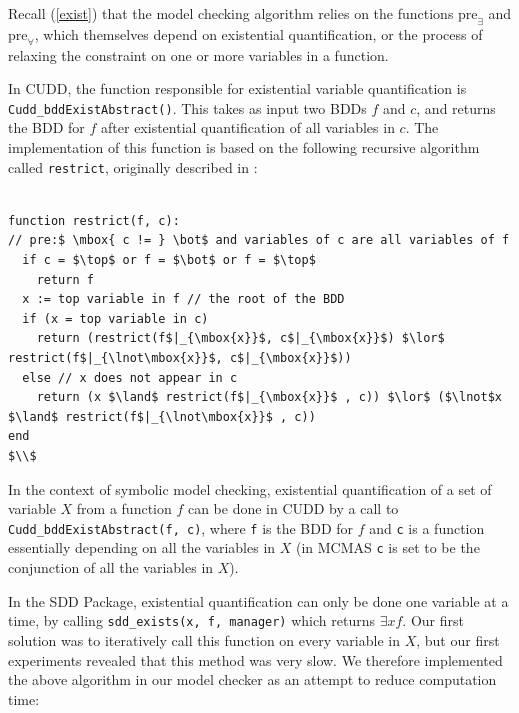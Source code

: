 \documentclass[11pt]{article}
\begin{document}
Recall  (\ref{exist}) that the model checking algorithm relies on the functions $\mbox{pre}_\exists$ and $\mbox{pre}_\forall$, which themselves depend on existential quantification, or the process of relaxing the constraint on one or more variables in a function. 

In CUDD, the function responsible for existential variable quantification is \texttt{Cudd\_bddExistAbstract()}. This takes as input two BDDs $f$ and $c$, and returns the BDD for $f$ after existential quantification of all variables in $c$. The implementation of this function is based on the following recursive algorithm called \texttt{restrict}, originally described in \cite{unified_framework}: 

\begin{lstlisting}[mathescape]

function restrict(f, c):
// pre:$ \mbox{ c != } \bot$ and variables of c are all variables of f
  if c = $\top$ or f = $\bot$ or f = $\top$
    return f
  x := top variable in f // the root of the BDD
  if (x = top variable in c)  
    return (restrict(f$|_{\mbox{x}}$, c$|_{\mbox{x}}$) $\lor$ restrict(f$|_{\lnot\mbox{x}}$, c$|_{\mbox{x}}$))
  else // x does not appear in c
    return (x $\land$ restrict(f$|_{\mbox{x}}$ , c)) $\lor$ ($\lnot$x $\land$ restrict(f$|_{\lnot\mbox{x}}$ , c))
end
$\\$
\end{lstlisting}

In the context of symbolic model checking, existential quantification of a set of variable $X$ from a function $f$ can be done in CUDD by a call to \texttt{Cudd\_bddExistAbstract(f, c)}, where \texttt{f} is the BDD for $f$ and \texttt{c} is a function essentially depending on all the variables in $X$ (in MCMAS \texttt{c} is set to be the conjunction of all the variables in $X$).

In the SDD Package, existential quantification can only be done one variable at a time, by calling \texttt{sdd\_exists(x, f, manager)} which returns $\exists x f$. Our first solution was to iteratively call this function on every variable in $X$, but our first experiments revealed that this method was very slow. We therefore implemented the above algorithm in our model checker as an attempt to reduce computation time:
\end{document}
